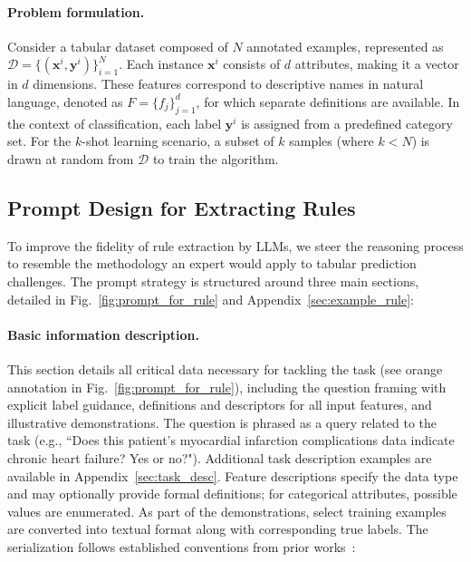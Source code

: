 \vspace*{-0.12in}
\paragraph{Problem formulation.} Consider a tabular dataset composed of $N$ annotated examples, represented as $\mathcal{D} = \{(\mathbf{x}^i, \mathbf{y}^i)\}_{i=1}^{N}$. Each instance $\mathbf{x}^i$ consists of $d$ attributes, making it a vector in $d$ dimensions. These features correspond to descriptive names in natural language, denoted as $F = \{f_j\}_{j=1}^{d}$, for which separate definitions are available. In the context of classification, each label $\mathbf{y}^i$ is assigned from a predefined category set. For the $k$-shot learning scenario, a subset of $k$ samples (where $k < N$) is drawn at random from $\mathcal{D}$ to train the algorithm.

\subsection{Prompt Design for Extracting Rules}
\label{Sec:prompt_design}
To improve the fidelity of rule extraction by LLMs, we steer the reasoning process to resemble the methodology an expert would apply to tabular prediction challenges. The prompt strategy is structured around three main sections, detailed in Fig.~\ref{fig:prompt_for_rule} and Appendix~\ref{sec:example_rule}:

\vspace*{-0.12in}
\paragraph{Basic information description.} This section details all critical data necessary for tackling the task (see orange annotation in Fig.~\ref{fig:prompt_for_rule}), including the question framing with explicit label guidance, definitions and descriptors for all input features, and illustrative demonstrations. The question is phrased as a query related to the task (e.g., ``Does this patient's myocardial infarction complications data indicate chronic heart failure? Yes or no?"). Additional task description examples are available in Appendix~\ref{sec:task_desc}. Feature descriptions specify the data type and may optionally provide formal definitions; for categorical attributes, possible values are enumerated. As part of the demonstrations, select training examples are converted into textual format along with corresponding true labels. The serialization follows established conventions from prior works~\cite{dinh2022lift,hegselmann2023tabllm}:

